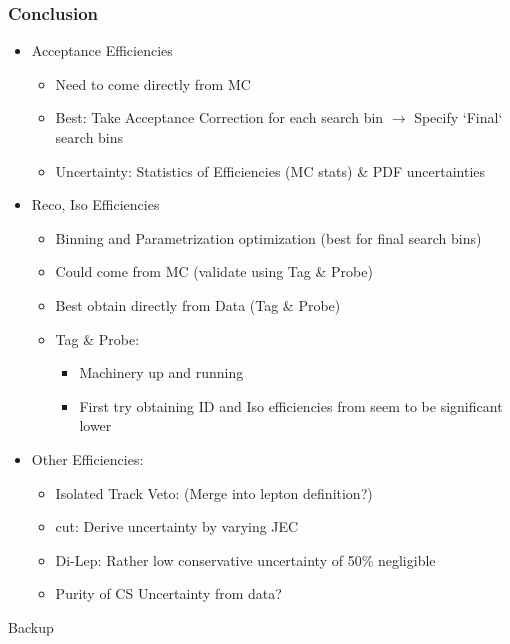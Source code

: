 \documentclass{beamer}
\begin{document}
\begin{frame}
 \frametitle{Conclusion}
 \begin{itemize}
  \item Acceptance Efficiencies
  \begin{itemize}
   \item Need to come directly from MC
   \item Best: Take Acceptance Correction for each search bin $\rightarrow$ Specify `Final` search bins
   \item Uncertainty: Statistics of Efficiencies (MC stats) \& PDF uncertainties
  \end{itemize}
  \item Reco, Iso Efficiencies
  \begin{itemize}
   \item Binning and Parametrization optimization (best for final search bins)
   \item Could come from MC (validate using Tag \& Probe)
   \item Best obtain directly from Data (Tag \& Probe)

  \item Tag \& Probe:
 \begin{itemize}
  \item Machinery up and running
  \item First try obtaining ID and Iso efficiencies from \Zll seem to be significant lower
 \end{itemize}
 \end{itemize}
 \item Other Efficiencies:
 \begin{itemize}
  \item Isolated Track Veto: (Merge into lepton definition?)
  \item \mt cut: Derive uncertainty by varying JEC
  \item Di-Lep: Rather low conservative uncertainty of 50\% negligible
  \item Purity of CS Uncertainty from data?
 \end{itemize}

 \end{itemize}

\end{frame}

\begin{frame}
 \begin{block}{}
 \centering
 \Large Backup
 \end{block}
\end{frame}
\end{document}
